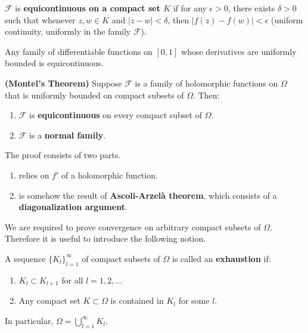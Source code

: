 \documentclass{article}
\begin{document}
\begin{definition}
$\mathcal{F}$ is \textbf{equicontinuous on a compact set $K$} if for any $\epsilon > 0$, there exists $\delta > 0$ such that whenever $z, w \in K$ and $|z-w| < \delta$, then $|f(z) - f(w)| < \epsilon$ (uniform continuity, uniformly in the family $\mathcal{F}$).
\end{definition}

\begin{example}
Any family of differentiable functions on $[0,1]$ whose derivatives are uniformly bounded is equicontinuous.
\end{example}

\begin{theorem}
\textbf{(Montel's Theorem)}
Suppose $\mathcal{F}$ is a family of holomorphic functions on $\Omega$ that is uniformly bounded on compact subsets of $\Omega$. Then:
\begin{enumerate}
    \item $\mathcal{F}$ is \textbf{equicontinuous} on every compact subset of $\Omega$.
    \item $\mathcal{F}$ is a \textbf{normal family}.
\end{enumerate}
\end{theorem}

\begin{remark}
The proof consists of two parts.
\begin{enumerate}
    \item relies on $f'$ of a holomorphic function.
    \item is somehow the result of \textbf{Ascoli-Arzel\`a theorem}, which consists of a \textbf{diagonalization argument}.
\end{enumerate}

We are required to prove convergence on arbitrary compact subsets of $\Omega$. Therefore it is useful to introduce the following notion.
\end{remark}

\begin{definition}
A sequence $\{K_l\}_{l=1}^\infty$ of compact subsets of $\Omega$ is called an \textbf{exhaustion} if:
\begin{enumerate}
    \item $K_l \subset K_{l+1}$ for all $l=1, 2, \dots$
    \item Any compact set $K \subset \Omega$ is contained in $K_l$ for some $l$.
\end{enumerate}
In particular, $\Omega = \bigcup_{l=1}^\infty K_l$.
\end{definition}
\end{document}

